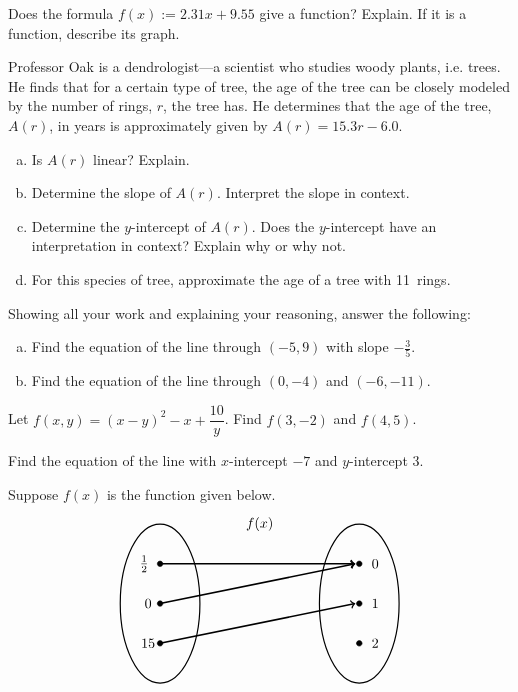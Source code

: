\documentclass[11pt,letterpaper]{article}
\begin{document}
\prob Does the formula $f(x):= 2.31x + 9.55$ give a function? Explain. If it is a function, describe its graph. \pspace 


\prob Professor Oak is a dendrologist---a scientist who studies woody plants, i.e. trees. He finds that for a certain type of tree, the age of the tree can be closely modeled by the number of rings, $r$, the tree has. He determines that the age of the tree, $A(r)$, in years is approximately given by $A(r)= 15.3r - 6.0$. 
	\begin{enumerate}[(a)]
	\item Is $A(r)$ linear? Explain.
	\item Determine the slope of $A(r)$. Interpret the slope in context. 
	\item Determine the $y$-intercept of $A(r)$. Does the $y$-intercept have an interpretation in context? Explain why or why not. 
	\item For this species of tree, approximate the age of a tree with 11~rings. 
	\end{enumerate} \pspace


\prob Showing all your work and explaining your reasoning, answer the following:
	\begin{enumerate}[(a)]
	\item Find the equation of the line through $(-5, 9)$ with slope $-\frac{3}{5}$.
	\item Find the equation of the line through $(0, -4)$ and $(-6, -11)$. 
	\end{enumerate} \pspace
	

\prob	 Let $f(x, y)= (x - y)^2 - x + \dfrac{10}{y}$. Find $f(3, -2)$ and $f(4, 5)$. \pspace 


\prob Find the equation of the line with $x$-intercept $-7$ and $y$-intercept 3. \pspace 
	
	
\prob Suppose $f(x)$ is the function given below.
	\[
	\begin{tikzpicture}
	\node at (2.5,2) {$f(x)$};
	\draw[line width=0.03cm] (0,0) circle (1 and 2);
	\draw[line width=0.03cm] (5,0) circle (1 and 2);
	
	\draw[fill=black] (0,1) circle (0.07);
	\draw[fill=black] (0,0) circle (0.07);
	\draw[fill=black] (0,-1) circle (0.07);
	
	\draw[fill=black] (5,1) circle (0.07);
	\draw[fill=black] (5,0) circle (0.07);
	\draw[fill=black] (5,-1) circle (0.07);
	
	\draw[line width=0.04cm,->] (0,1) -- (4.9,1);
	\draw[line width=0.04cm,->] (0,0) -- (4.9,1);
	\draw[line width=0.04cm,->] (0,-1) -- (4.9,0);
	
	\node at (-0.4,1) {$\frac{1}{2}$};
	\node at (-0.3,0) {$0$};
	\node at (-0.3,-1) {$15$};
	
	\node at (5.4,1) {$0$};
	\node at (5.4,0) {$1$};
	\node at (5.4,-1) {$2$};
	\end{tikzpicture}
	\]
\end{document}
